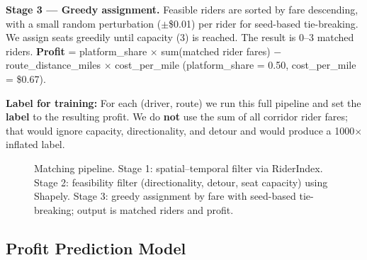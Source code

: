 \documentclass[11pt,a4paper]{article}
\begin{document}
\textbf{Stage 3 --- Greedy assignment.} Feasible riders are sorted by fare descending, with a small random perturbation ($\pm$\$0.01) per rider for seed-based tie-breaking. We assign seats greedily until capacity (3) is reached. The result is 0--3 matched riders. \textbf{Profit} = platform\_share $\times$ sum(matched rider fares) $-$ route\_distance\_miles $\times$ cost\_per\_mile (platform\_share = 0.50, cost\_per\_mile = \$0.67).

\textbf{Label for training:} For each (driver, route) we run this full pipeline and set the \textbf{label} to the resulting profit. We do \textbf{not} use the sum of all corridor rider fares; that would ignore capacity, directionality, and detour and would produce a 1000$\times$ inflated label.

\begin{figure}[htbp]
\centering
{}
\caption{Matching pipeline. Stage 1: spatial--temporal filter via RiderIndex. Stage 2: feasibility filter (directionality, detour, seat capacity) using Shapely. Stage 3: greedy assignment by fare with seed-based tie-breaking; output is matched riders and profit.}
\label{fig:matching-pipeline}
\end{figure}

\subsection{Profit Prediction Model}
\end{document}
